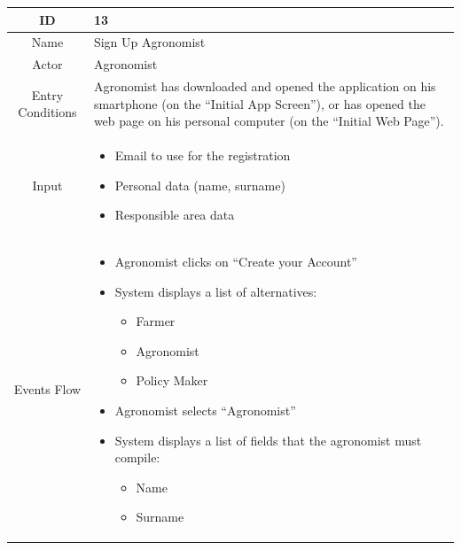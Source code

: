 \documentclass{article}
\begin{document}
\begin{center}

    
    
    \begin{longtable}{|c| p{10cm}|}
        \hline
            ID & 13 \\
        \hline
            Name & Sign Up Agronomist\\
        \hline
            Actor & Agronomist \\
        \hline
            Entry Conditions & Agronomist has downloaded and opened the application on his smartphone (on the “Initial App Screen”), or has opened the web page on his personal computer (on the “Initial Web Page”).\\
        \hline
            Input & \begin{itemize}
                        \item Email to use for the registration
                        \item Personal data (name, surname)
                        \item Responsible area data
                    \end{itemize}\\
        \hline
            Events Flow &   \begin{itemize}
                                \item Agronomist clicks on “Create your Account”
                                \item System displays a list of alternatives:
                                        \begin{itemize}
                                            \item Farmer
                                            \item Agronomist
                                            \item Policy Maker
                                        \end{itemize}
                                \item Agronomist selects “Agronomist”
                                \item System displays a list of fields that the agronomist must compile:
                                        \begin{itemize}
                                            \item Name
                                            \item Surname

\end{itemize}
\end{itemize}
\end{longtable}
\end{center}
\end{document}
